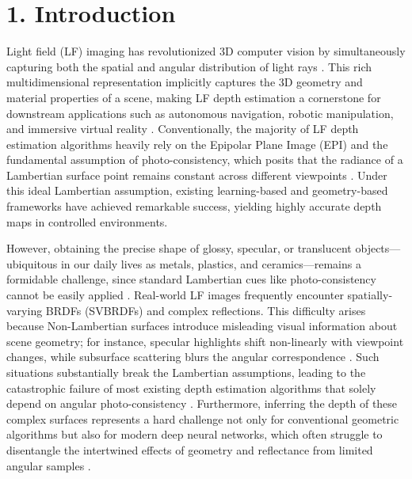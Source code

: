 \section{1. Introduction}

Light field (LF) imaging has revolutionized 3D computer vision by simultaneously capturing both the spatial and angular distribution of light rays \cite{lightfieldimaging3Dreconst}. This rich multidimensional representation implicitly captures the 3D geometry and material properties of a scene, making LF depth estimation a cornerstone for downstream applications such as autonomous navigation, robotic manipulation, and immersive virtual reality \cite{autonomousnavigationrobotic}. Conventionally, the majority of LF depth estimation algorithms heavily rely on the Epipolar Plane Image (EPI) and the fundamental assumption of photo-consistency, which posits that the radiance of a Lambertian surface point remains constant across different viewpoints \cite{EpipolarPlaneImagesphotoco}. Under this ideal Lambertian assumption, existing learning-based and geometry-based frameworks have achieved remarkable success, yielding highly accurate depth maps in controlled environments.

However, obtaining the precise shape of glossy, specular, or translucent objects—ubiquitous in our daily lives as metals, plastics, and ceramics—remains a formidable challenge, since standard Lambertian cues like photo-consistency cannot be easily applied \cite{glossyobjectsspecularreflec}. Real-world LF images frequently encounter spatially-varying BRDFs (SVBRDFs) and complex reflections. This difficulty arises because Non-Lambertian surfaces introduce misleading visual information about scene geometry; for instance, specular highlights shift non-linearly with viewpoint changes, while subsurface scattering blurs the angular correspondence \cite{spatiallyvaryingBRDFsmislea}. Such situations substantially break the Lambertian assumptions, leading to the catastrophic failure of most existing depth estimation algorithms that solely depend on angular photo-consistency \cite{Lambertianassumptionsangular}. Furthermore, inferring the depth of these complex surfaces represents a hard challenge not only for conventional geometric algorithms but also for modern deep neural networks, which often struggle to disentangle the intertwined effects of geometry and reflectance from limited angular samples \cite{deepneuralnetworksdisentang}.

